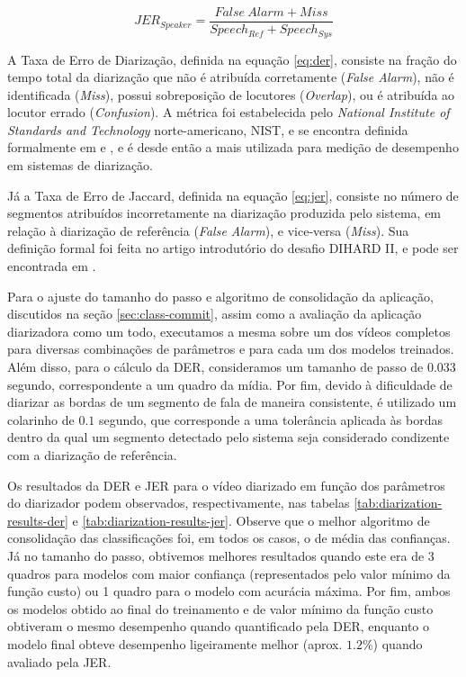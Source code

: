 \begin{equation}\label{eq:jer}
    JER_{Speaker} = \frac{False\ Alarm + Miss}{Speech_{Ref} + Speech_{Sys}}
\end{equation}

A Taxa de Erro de Diarização, definida na equação \ref{eq:der}, consiste na fração do tempo total da diarização que não é atribuída corretamente (\textit{False Alarm}), não é identificada (\textit{Miss}), possui sobreposição de locutores (\textit{Overlap}), ou é atribuída ao locutor errado (\textit{Confusion}).
A métrica foi estabelecida pelo \textit{National Institute of Standards and Technology} norte-americano, NIST, e se encontra definida formalmente em \cite{nist2009RT09Rich2009} e \cite{fiscusRichTranscription20062006}, e é desde então a mais utilizada para medição de desempenho em sistemas de diarização.

Já a Taxa de Erro de Jaccard, definida na equação \ref{eq:jer}, consiste no número de segmentos atribuídos incorretamente na diarização produzida pelo sistema, em relação à diarização de referência (\textit{False Alarm}), e vice-versa (\textit{Miss}).
Sua definição formal foi feita no artigo introdutório do desafio DIHARD II, e pode ser encontrada em  \cite{ryantSecondDIHARDDiarization2019}.

Para o ajuste do tamanho do passo e algoritmo de consolidação da aplicação, discutidos na seção \ref{sec:class-commit}, assim como a avaliação da aplicação diarizadora como um todo, executamos a mesma sobre um dos vídeos completos para diversas combinações de parâmetros e para cada um dos modelos treinados. 
Além disso, para o cálculo da DER, consideramos um tamanho de passo de $0.033$ segundo, correspondente a um quadro da mídia.
Por fim, devido à dificuldade de diarizar as bordas de um segmento de fala de maneira consistente, é utilizado um colarinho de $0.1$ segundo, que corresponde a uma tolerância aplicada às bordas dentro da qual um segmento detectado pelo sistema seja considerado condizente com a diarização de referência.

Os resultados da DER e JER para o vídeo diarizado em função dos parâmetros do diarizador podem observados, respectivamente, nas tabelas \ref{tab:diarization-results-der} e \ref{tab:diarization-results-jer}.
Observe que o melhor algoritmo de consolidação das classificações foi, em todos os casos, o de média das confianças.
Já no tamanho do passo, obtivemos melhores resultados quando este era de 3 quadros para modelos com maior confiança (representados pelo valor mínimo da função custo) ou 1 quadro para o modelo com acurácia máxima.
Por fim, ambos os modelos obtido ao final do treinamento e de valor mínimo da função custo obtiveram o mesmo desempenho quando quantificado pela DER, enquanto o modelo final obteve desempenho ligeiramente melhor (aprox. $1.2\%$) quando avaliado pela JER.

